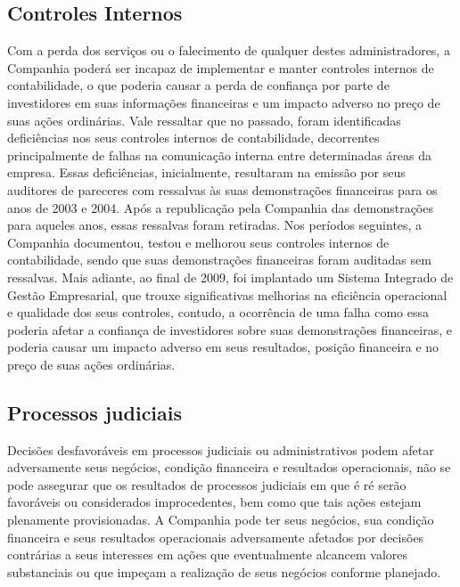 {{{\subsection{Controles Internos}
Com a perda dos serviços ou o falecimento de qualquer destes administradores, a Companhia poderá ser incapaz de implementar e manter controles internos de contabilidade, o que poderia causar a perda de confiança por parte de investidores em suas informações financeiras e um impacto adverso no preço de suas ações ordinárias. Vale ressaltar que no passado, foram identificadas deficiências nos seus controles internos de contabilidade, decorrentes principalmente de falhas na comunicação interna entre determinadas áreas da empresa. Essas deficiências, inicialmente, resultaram na emissão por seus auditores de pareceres com ressalvas às suas demonstrações financeiras para os anos de 2003 e 2004. Após a republicação pela Companhia das demonstrações para aqueles anos, essas ressalvas foram retiradas. Nos períodos seguintes, a Companhia documentou, testou e melhorou seus controles internos de contabilidade, sendo que suas demonstrações financeiras foram auditadas sem ressalvas. Mais adiante, ao final de 2009, foi implantado um Sistema Integrado de Gestão Empresarial, que trouxe significativas melhorias na eficiência operacional e qualidade dos seus controles, contudo, a ocorrência de uma falha como essa poderia afetar a confiança de investidores sobre suas demonstrações financeiras, e poderia causar um impacto adverso em seus resultados, posição financeira e no preço de suas ações ordinárias.

\subsection{Processos judiciais}
Decisões desfavoráveis em processos judiciais ou administrativos podem afetar adversamente seus negócios, condição financeira e resultados operacionais, não se pode assegurar que os resultados de processos judiciais em que é ré serão favoráveis ou considerados improcedentes, bem como que tais ações estejam plenamente provisionadas. A Companhia pode ter seus negócios, sua condição financeira e seus resultados operacionais adversamente afetados por decisões contrárias a seus interesses em ações que eventualmente alcancem valores substanciais ou que impeçam a realização de seus negócios conforme planejado.

}}}
